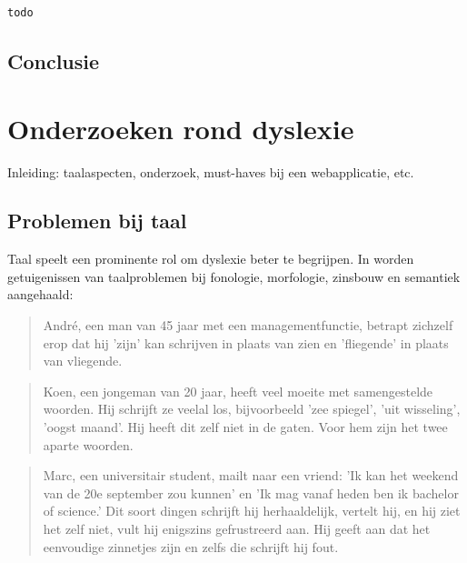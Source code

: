 \begin{lstlisting}[language=Python]
todo
\end{lstlisting}

\subsection{Conclusie}


\section{Onderzoeken rond dyslexie}

Inleiding: taalaspecten, onderzoek, must-haves bij een webapplicatie, etc.

\subsection{Problemen bij taal}


Taal speelt een prominente rol om dyslexie beter te begrijpen.  In \textcite{Avontuur2015} worden getuigenissen van taalproblemen bij fonologie, morfologie, zinsbouw en semantiek aangehaald:

\begin{quote}
	André, een man van 45 jaar met een managementfunctie, betrapt zichzelf erop dat hij 'zijn' kan schrijven in plaats van zien en 'fliegende' in plaats van vliegende.
\end{quote}

\begin{quote}
	Koen, een jongeman van 20 jaar, heeft veel moeite met samengestelde woorden. Hij schrijft ze veelal los, bijvoorbeeld 'zee spiegel', 'uit wisseling', 'oogst maand'. Hij heeft dit zelf niet in de gaten. Voor hem zijn het twee aparte woorden.
\end{quote}

\begin{quote}
	Marc, een universitair student, mailt naar een vriend: 'Ik kan het weekend van de 20e september zou kunnen' en 'Ik mag vanaf heden ben ik bachelor of science.' Dit soort dingen schrijft hij herhaaldelijk, vertelt hij, en hij ziet het zelf niet, vult hij enigszins gefrustreerd aan. Hij geeft aan dat het eenvoudige zinnetjes zijn en zelfs die schrijft hij fout.
\end{quote}

